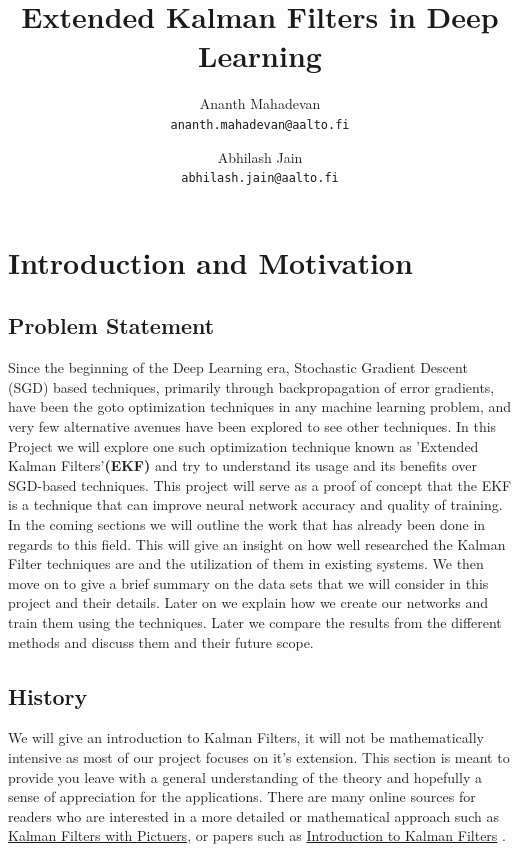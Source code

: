 \documentclass{article}
\title{Extended Kalman Filters in Deep Learning}
\author{  Ananth Mahadevan\\
  \texttt{ananth.mahadevan@aalto.fi}
  \and
  Abhilash Jain\\
  \texttt{abhilash.jain@aalto.fi}}
\date{}
\begin{document}
\maketitle
\clearpage
\tableofcontents
\clearpage 


\section{Introduction and Motivation }
\subsection{Problem Statement}
Since the beginning of the Deep Learning era, Stochastic Gradient Descent (SGD) based techniques, primarily through backpropagation of error gradients, have been the goto optimization techniques in any machine learning problem, and very few alternative avenues have been explored to see other techniques. In this Project we will explore one such optimization technique known as 'Extended Kalman Filters'\textbf{(EKF)} and try to understand its usage and its benefits over SGD-based techniques. This project will serve as a proof of concept that the EKF is a technique that can improve neural network accuracy and quality of training.
In the coming sections we will outline the work that has already been done in regards to this field. This will give an insight on how well researched the Kalman Filter techniques are and the utilization of them in existing systems. We then move on to give a brief summary on the data sets that we will consider in this project and their details. Later on we explain how we create our networks and train them using the techniques. Later we compare the results from the different methods and discuss them and their future scope.

\subsection{History}
We will give an introduction to Kalman Filters, it will not be mathematically intensive as most of our project focuses on it's extension. This section is meant to provide you leave with a general understanding of the theory and hopefully a sense of appreciation for the applications. There are many online sources for readers who are interested in a more detailed or mathematical approach such as \href{https://www.bzarg.com/p/how-a-kalman-filter-works-in-pictures/}{Kalman Filters with Pictuers}, or papers such as \href{http://byron.soe.ucsc.edu/projects/SeaSlug/Documents/Publications/Kalman\%20Filtering/An\%20Introduction\%20to\%20the\%20Kalman\%20Fiter2.pdf}{Introduction to Kalman Filters} \cite{Welch:1995:IKF:897831}.
\end{document}
